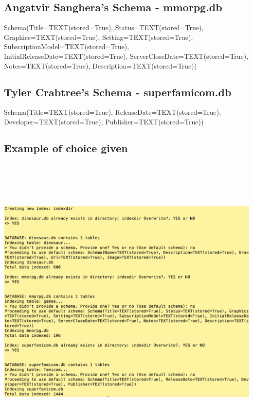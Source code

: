 \documentclass[]{article}
\begin{document}
\subsection{Angatvir Sanghera's Schema - mmorpg.db}
Schema(Title=TEXT(stored=True), Status=TEXT(stored=True), Graphics=TEXT(stored=True), Setting=TEXT(stored=True), SubscriptionModel=TEXT(stored=True),\\ InitialReleaseDate=TEXT(stored=True), ServerCloseDate=TEXT(stored=True),\\ Notes=TEXT(stored=True), Description=TEXT(stored=True))

\subsection{Tyler Crabtree's Schema - superfamicom.db}
Schema(Title=TEXT(stored=True), ReleaseDate=TEXT(stored=True),\\ Developer=TEXT(stored=True), Publisher=TEXT(stored=True))

\subsection{Example of choice given}
\includegraphics[width=15cm, height=15cm]{schema.png}
\end{document}
